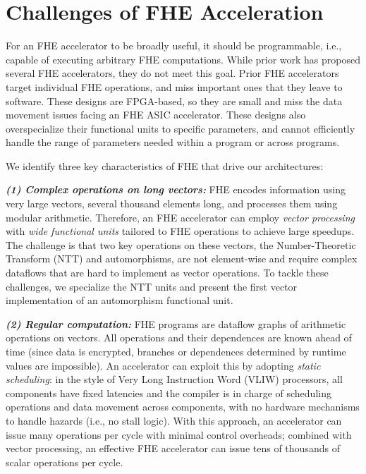 \section{Challenges of FHE Acceleration}
\label{sec:general}

For an FHE accelerator to be broadly useful, it should be programmable, i.e.,
capable of executing arbitrary FHE computations. While prior work has proposed
several FHE accelerators, they do not meet this goal. Prior FHE
accelerators~\cite{cousins:hpec14:fpga-he,cousins:tetc17:fpga-he,doroz:tc15:accelerating-fhe,roy:hpca19:fpga-he,riazi:asplos20:heax,turan:tc20:heaws}
target individual FHE operations, and miss important ones that they leave to
software. These designs are FPGA-based, so they are small and miss the data
movement issues facing an FHE ASIC accelerator. These designs also
overspecialize their functional units to specific parameters, and cannot
efficiently handle the range of parameters needed within a program or across
programs.

We identify three key characteristics of FHE that drive our architectures:

\noindent \textbf{\emph{(1) Complex operations on long vectors:}}
FHE encodes information using very large vectors, several thousand elements
long, and processes them using modular arithmetic. Therefore, an FHE
accelerator can employ \emph{vector processing} with \emph{wide functional
units} tailored to FHE operations to achieve large speedups. The challenge is
that two key operations on these vectors, the Number-Theoretic Transform (NTT)
and automorphisms, are not element-wise and require complex dataflows that are
hard to implement as vector operations. To tackle these challenges, we
specialize the NTT units and present the first vector implementation of an
automorphism functional unit.

\noindent \textbf{\emph{(2) Regular computation:}}
FHE programs are dataflow graphs of arithmetic operations on vectors. All
operations and their dependences are known ahead of time (since data is
encrypted, branches or dependences determined by runtime values are
impossible). An accelerator can exploit this by adopting \emph{static
scheduling}: in the style of Very Long Instruction Word (VLIW) processors, all
components have fixed latencies and the compiler is in charge of scheduling
operations and data movement across components, with no hardware mechanisms to
handle hazards (i.e., no stall logic). With this approach, an accelerator can
issue many operations per cycle with minimal control overheads; combined with
vector processing, an effective FHE accelerator can issue tens of thousands of
scalar operations per cycle.

